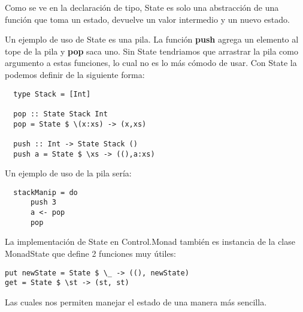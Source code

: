 Como se ve en la declaración de tipo, State es solo una abstracción
de una función que toma un estado, devuelve un valor intermedio y un nuevo
estado.

Un ejemplo de uso de State es una pila. La función \textbf{push}
agrega un elemento al tope de la pila y \textbf{pop} saca uno. Sin State
tendriamos que arrastrar la pila como argumento a estas funciones, lo cual
no es lo más cómodo de usar. Con State la podemos definir de la siguiente
forma:

\begin{lstlisting}
  type Stack = [Int]

  pop :: State Stack Int
  pop = State $ \(x:xs) -> (x,xs)

  push :: Int -> State Stack ()
  push a = State $ \xs -> ((),a:xs)

\end{lstlisting}

Un ejemplo de uso de la pila sería:

\begin{lstlisting}
  stackManip = do
      push 3
      a <- pop
      pop
\end{lstlisting}


La implementación de State en Control.Monad también es instancia de la clase
MonadState que define 2 funciones muy útiles:

\begin{lstlisting}
put newState = State $ \_ -> ((), newState)
get = State $ \st -> (st, st)
\end{lstlisting}

Las cuales nos permiten manejar el estado de una manera más sencilla.



